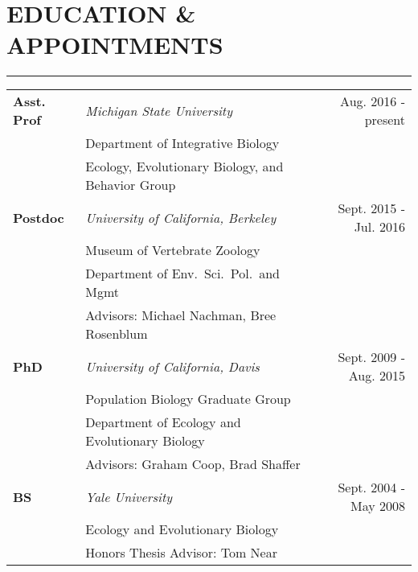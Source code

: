 \documentclass{article}
\begin{document}
\section*{EDUCATION \& APPOINTMENTS}
\vspace{-0.6cm}
\rule{470pt}{0.4pt}
%
\begin{tabular}{@{}p{}p{}R@{}}
\\
\bf{Asst. Prof} & \it{Michigan State University} & Aug. 2016 - present\\
 & \hspace{0.5cm}Department of Integrative Biology & \\
 & \hspace{0.5cm}Ecology, Evolutionary Biology, and Behavior Group& \\
%
%
\bf{Postdoc} & \it{University of California, Berkeley} & Sept. 2015 - Jul. 2016\\
 & \hspace{0.5cm}Museum of Vertebrate Zoology & \\
 & \hspace{0.5cm}Department of Env.\ Sci.\ Pol.\ and Mgmt& \\
 & \hspace{0.5cm}Advisors: Michael Nachman, Bree Rosenblum & \\ 
%
%
\bf{PhD} & \it{University of California, Davis}  & Sept. 2009 - Aug. 2015\\
 & \hspace{0.5cm}Population Biology Graduate Group & \\
 & \hspace{0.5cm}Department of Ecology and Evolutionary Biology & \\
 & \hspace{0.5cm}Advisors: Graham Coop, Brad Shaffer & \\ 
%
%
\textbf{BS} & \it{Yale University} & Sept. 2004 - May 2008 \\
& \hspace{0.5cm}Ecology and Evolutionary Biology & \\
& \hspace{0.5cm}Honors Thesis Advisor: Tom Near & \\
\end{tabular}
%
\end{document}
